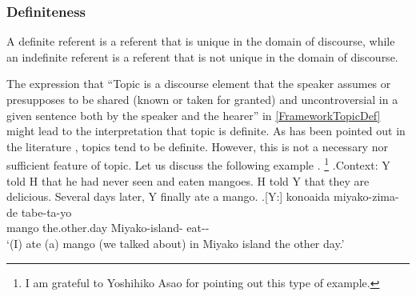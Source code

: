 \subsubsection{Definiteness}\label{Fr:Definition:TFFeathers:Definite}

A definite referent is a referent
that is unique in the domain of discourse,
while an indefinite referent is a referent
that is not unique in the domain of discourse.

The expression that ``Topic is a discourse element that the speaker assumes or presupposes to be shared (known or taken for granted) and uncontroversial in a given sentence both by the speaker and the hearer'' in \ref{FrameworkTopicDef} 
might lead to the interpretation that topic is definite.
As has been pointed out in the literature \cite{givon76,keenan76,comrie79,comrie83},
topics tend to be definite.
However, this is not a necessary nor sufficient feature of topic.
Let us discuss the following example \Next.%
	\footnote{
	I am grateful to Yoshihiko Asao
	for pointing out this type of example.
	}
\ex.\label{Fr:Definition:TFFeathers:Definite:Ex:Mango1}Context:
	Y told H that he had never seen and eaten mangoes.
	H told Y that they are delicious.
	Several days later, Y finally ate a mango.
	\ag.[Y:]  konoaida miyako-zima-de tabe-ta-yo \\
			mango the.other.day Miyako-island- eat-- \\
			`(I) ate (a) mango (we talked about) in Miyako island the other day.'

